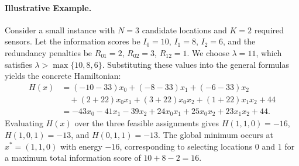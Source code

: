 \documentclass[12pt]{article}
\begin{document}
\paragraph{Illustrative Example.}
Consider a small instance with $N=3$ candidate locations and $K=2$ required sensors. Let the information scores be $I_0 = 10$, $I_1 = 8$, $I_2 = 6$, and the redundancy penalties be $R_{01} = 2$, $R_{02} = 3$, $R_{12} = 1$. We choose $\lambda = 11$, which satisfies $\lambda > \max\{10, 8, 6\}$. Substituting these values into the general formulas yields the concrete Hamiltonian:
\begin{align}
  H(x) &= (-10 - 33)x_0 + (-8 - 33)x_1 + (-6 - 33)x_2 \nonumber \\
       &\quad + (2 + 22)x_0 x_1 + (3 + 22)x_0 x_2 + (1 + 22)x_1 x_2 + 44 \nonumber \\
       &= -43x_0 - 41x_1 - 39x_2 + 24x_0 x_1 + 25x_0 x_2 + 23x_1 x_2 + 44.
\end{align}
Evaluating $H(x)$ over the three feasible assignments gives $H(1,1,0) = -16$, $H(1,0,1) = -13$, and $H(0,1,1) = -13$. The global minimum occurs at $x^* = (1, 1, 0)$ with energy $-16$, corresponding to selecting locations $0$ and $1$ for a maximum total information score of $10 + 8 - 2 = 16$.
\end{document}
